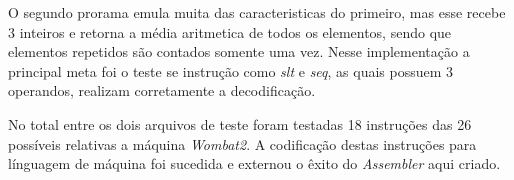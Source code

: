\documentclass{article}
\begin{document}
O segundo prorama emula muita das caracteristicas do primeiro, mas esse recebe 3 inteiros e retorna a média aritmetica de todos os elementos, sendo que elementos repetidos são contados somente uma vez. Nesse implementação a principal meta foi o teste se instrução como \textit{slt} e \textit{seq}, as quais possuem 3 operandos, realizam corretamente a decodificação.

No total entre os dois arquivos de teste foram testadas 18 instruções das 26 possíveis relativas a máquina \textit{Wombat2}. A codificação destas instruções para línguagem de máquina foi sucedida e externou o êxito do \textit{Assembler} aqui criado.

\subsection{}



\end{document}
